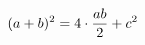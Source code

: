 \documentclass[preview]{standalone}
\begin{document}
\begin{align*}
\special{dvisvgm:raw <g id='unique000'>}(a+b)^2 = 4 \cdot \frac{ab}{2} + c^2\special{dvisvgm:raw </g>}
\end{align*}
\end{document}
